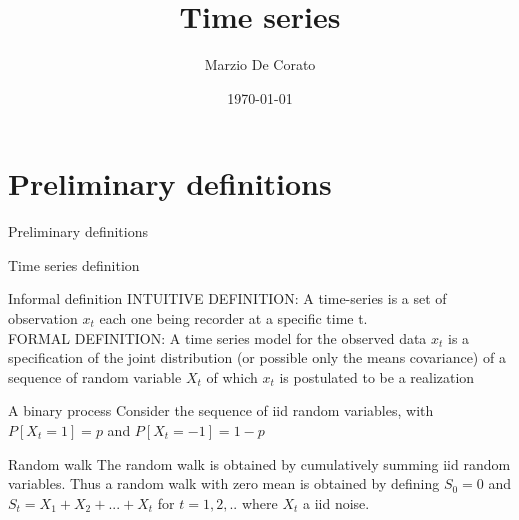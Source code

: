 \documentclass[11pt]{beamer}
\title[Review]{Time series}
\author{Marzio De Corato}
\date{\today}
\begin{document}
\begin{frame}
\vspace{+6.9 cm}  \titlepage
\end{frame}

\usebackgroundtemplate{ } 

\section{Preliminary definitions}


\begin{frame}
\begin{center}
\Huge
Preliminary definitions
\end{center}
\end{frame}

\begin{frame}{Time series definition \cite{brockwell2002introduction}}
\small
\begin{alertblock}{Informal definition}
INTUITIVE DEFINITION: A time-series is a set of observation $x_{t}$ each one being recorder at a specific time t.  \\
FORMAL DEFINITION: A time series model for the observed data ${x}_{t}$ is a specification of the joint distribution (or possible only the means covariance) of a sequence of random variable ${X}_{t}$ of which ${x}_{t}$ is postulated to be a realization
\end{alertblock}
\begin{exampleblock}{A binary process}
Consider the sequence of iid random variables, with $P[X_{t}=1]=p$ and $P[X_{t}=-1]=1-p$
\end{exampleblock}
\begin{exampleblock}{Random walk}
The random walk is obtained by cumulatively summing iid random variables. Thus a random walk with zero mean is obtained by defining $S_{0}=0$ and $S_{t}=X_{1}+X_{2}+...+X_{t}$ for $t=1,2,..$ where ${X_{t}}$ a iid noise. 
\end{exampleblock}
\end{frame}
\end{document}
